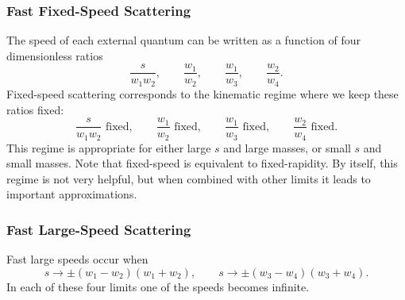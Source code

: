 \subsubsection{Fast Fixed-Speed Scattering}
The speed of each external quantum can be written as a function of four dimensionless ratios
\begin{equation}
	\frac{s}{w_{1} w_{2}}, \qquad \frac{w_{1}}{w_{2}}, \qquad \frac{w_{1}}{w_{3}}, \qquad \frac{w_{2}}{w_{4}}.
\end{equation}
Fixed-speed scattering corresponds to the kinematic regime where we keep these ratios fixed:
\begin{equation}
	\frac{s}{w_{1} w_{2}} \text{ fixed}, \qquad \frac{w_{1}}{w_{2}} \text{ fixed}, \qquad \frac{w_{1}}{w_{3}} \text{ fixed}, \qquad \frac{w_{2}}{w_{4}} \text{ fixed}.
\end{equation}
This regime is appropriate for either large $s$ and large masses, or small $s$ and small masses. Note that fixed-speed is equivalent to fixed-rapidity. By itself, this regime is not very helpful, but when combined with other limits it leads to important approximations.
\subsubsection{Fast Large-Speed Scattering}
Fast large speeds occur when
\begin{equation}
	s \rightarrow \pm \left(w_{1} - w_{2}\right)\left(w_{1} + w_{2}\right), \qquad s \rightarrow \pm \left(w_{3} - w_{4}\right)\left(w_{3} + w_{4}\right).
\end{equation}
In each of these four limits one of the speeds becomes infinite.

